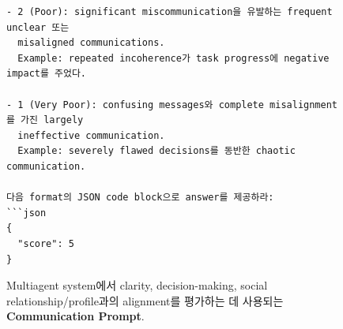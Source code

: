 \begin{figure}[htbp]
\begin{tcolorbox}[
    title=\textbf{Communication Evaluation Prompt},
    colback=green!1!white,
    colframe=green!50!black,
    fonttitle=\bfseries
]
\begin{verbatim}
- 2 (Poor): significant miscommunication을 유발하는 frequent unclear 또는
  misaligned communications.
  Example: repeated incoherence가 task progress에 negative impact를 주었다.

- 1 (Very Poor): confusing messages와 complete misalignment를 가진 largely
  ineffective communication.
  Example: severely flawed decisions를 동반한 chaotic communication.

다음 format의 JSON code block으로 answer를 제공하라:
```json
{
  "score": 5
}
\end{verbatim}
\end{tcolorbox}

\caption{Multiagent system에서 clarity, decision-making, social relationship/profile과의 alignment를 평가하는 데 사용되는 \textbf{Communication Prompt}.} \label{fig:communication_prompt} \end{figure}




